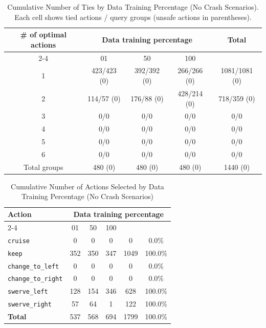 \documentclass{article}
\begin{document}
\begin{table}[h]
\centering
\caption{Cumulative Number of Ties by Data Training Percentage (No Crash Scenarios).
Each cell shows tied actions / query groups (unsafe actions in parentheses).}
\begin{tabular}{c|ccc|c}
\toprule
\multirow{2}{*}{\# of optimal actions} & \multicolumn{3}{c|}{Data training percentage} & \multirow{2}{*}{Total} \\
\cmidrule{2-4}
 & 01 & 50 & 100 & \\
\midrule
1 & 423/423 (0) & 392/392 (0) & 266/266 (0) & 1081/1081 (0) \\ 
2 & 114/57 (0) & 176/88 (0) & 428/214 (0) & 718/359 (0) \\ 
3 & 0/0 & 0/0 & 0/0 & 0/0 \\ 
4 & 0/0 & 0/0 & 0/0 & 0/0 \\ 
5 & 0/0 & 0/0 & 0/0 & 0/0 \\ 
6 & 0/0 & 0/0 & 0/0 & 0/0 \\ 
\midrule
Total groups & 480 (0) & 480 (0) & 480 (0) & 1440 (0) \\ 
\bottomrule
\end{tabular}
\end{table}

\begin{table}[h]
\centering
\caption{Cumulative Number of Actions Selected by Data Training Percentage (No Crash Scenarios)}
\begin{tabular}{l|ccc|c|c}
\toprule
\multirow{2}{*}{Action} & \multicolumn{5}{c|}{Data training percentage} & \multirow{2}{*}{Total} & \multirow{2}{*}{Safe (\%)} \\
\cmidrule{2-4}
 & 01 & 50  & 100 & & \\
\midrule
\texttt{cruise} & 0 & 0 & 0 & 0 & 0.0\% \\ 
\texttt{keep} & 352 & 350 & 347 & 1049 & 100.0\% \\ 
\texttt{change\_to\_left} & 0 & 0 & 0 & 0 & 0.0\% \\ 
\texttt{change\_to\_right} & 0 & 0 & 0 & 0 & 0.0\% \\ 
\texttt{swerve\_left} & 128 & 154 & 346 & 628 & 100.0\% \\ 
\texttt{swerve\_right} & 57 & 64 & 1 & 122 & 100.0\% \\ 
\midrule
\textbf{Total} & 537 & 568 & 694 & 1799 & 100.0\% \\ 
\bottomrule
\end{tabular}
\end{table}
\end{document}
